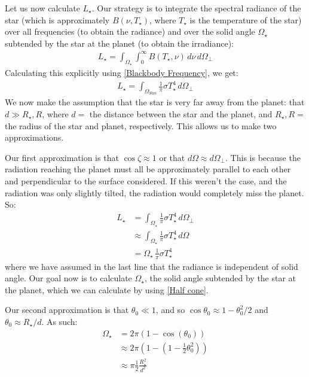 Let us now calculate $L_{\star}$. Our strategy is to integrate the spectral radiance of the star (which is approximately $B(\nu,T_{\star})$, where $T_{\star}$ is the temperature of the star) over all frequencies (to obtain the radiance) and over the solid angle $\Omega_\star$ subtended by the star at the planet (to obtain the irradiance):
\begin{align*}
    L_{\star}=\int_{\Omega_{\star}}\int _0^\infty B(T_{\star},\nu)\,d\nu\,d\Omega_\perp
\end{align*}
Calculating this explicitly using \ref{Blackbody Frequency}, we get:
\begin{align*}
    L_{\star}=\int_{\Omega_{Sun}} \frac{1}{\pi}\sigma T_{\star}^4 \, d\Omega_\perp
\end{align*}
We now make the assumption that the star is very far away from the planet: that $d \gg R_{\star}, R$, where $d=$ the distance between the star and the planet, and $R_\star, R=$ the radius of the star and planet, respectively. This allows us to make two approximations.

Our first approximation is that $\cos\zeta\approx1$ or that $d\Omega\approx d\Omega_\perp$. This is because the radiation reaching the planet must all be approximately parallel to each other and perpendicular to the surface considered. If this weren't the case, and the radiation was only slightly tilted, the radiation would completely miss the planet. So:
\begin{align*}
    L_\star &=\int_{\Omega_{\star}} \frac{1}{\pi}\sigma T_{\star}^4 \, d\Omega_\perp\\
    &\approx\int_{\Omega_{\star}} \frac{1}{\pi}\sigma T_{\star}^4 \, d\Omega\\
    &=\Omega_{\star}\,\frac{1}{\pi}\sigma T_{\star}^4
\end{align*}
where we have assumed in the last line that the radiance is independent of solid angle. Our goal now is to calculate $\Omega_{\star}$, the solid angle subtended by the star at the planet, which we can calculate by using \ref{Half cone}.

Our second approximation is that $\theta_0\ll 1$, and so $\cos\theta_0\approx 1-\theta_0^2/2$ and $\theta_0\approx R_\star/d$. As such:
\begin{align*}
    \Omega_\star&=2\pi (1-\cos(\theta_0))\\
    &\approx 2\pi \left( 1-\left( 1-\frac{1}{2}\theta_0^2 \right) \right)\\
    &\approx\pi \frac{1}{2}\frac{R_\star^2}{d^2}
\end{align*}


